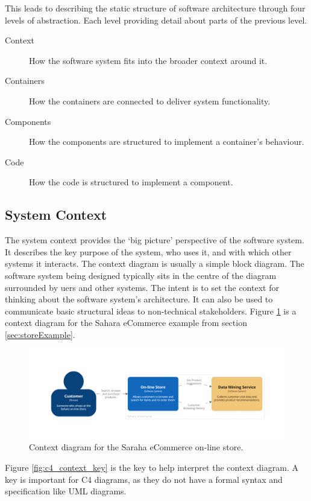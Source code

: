 \noindent
This leads to describing the static structure of software architecture through four levels of abstraction.
Each level providing detail about parts of the previous level.
\begin{description}
    \item[Context] How the software system fits into the broader context around it.
    \item[Containers] How the containers are connected to deliver system functionality.
    \item[Components] How the components are structured to implement a container's behaviour.
    \item[Code] How the code is structured to implement a component.
\end{description}

\subsection{System Context}
The system context provides the `big picture' perspective of the software system.
It describes the key purpose of the system, who uses it, and with which other systems it interacts.
The context diagram is usually a simple block diagram.
The software system being designed typically sits in the centre of the diagram surrounded by uers and other systems.
The intent is to set the context for thinking about the software system's architecture.
It can also be used to communicate basic structural ideas to non-technical stakeholders.
Figure \ref{fig:c4_context} is a context diagram for the Sahara eCommerce example from section \ref{sec:storeExample}.

\begin{figure}[h]
    \centering
    \includegraphics[trim=195 173 177 197,clip,width=\textwidth]{images/c4/context_diagram.png}
    \caption{Context diagram for the Saraha eCommerce on-line store.}
    \label{fig:c4_context}
\end{figure}

\noindent
Figure \ref{fig:c4_context_key} is the key to help interpret the context diagram.
A key is important for C4 diagrams, as they do not have a formal syntax and specification like UML diagrams.

